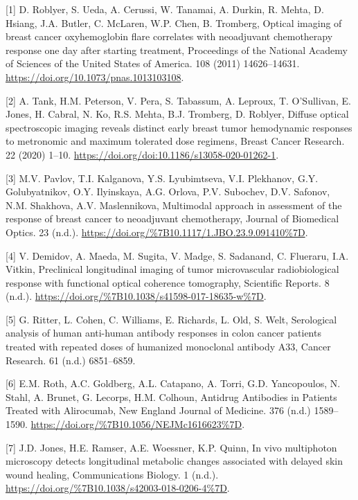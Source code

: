 \documentclass[
]{article}
\begin{document}
\hypertarget{refs}{}
\leavevmode\hypertarget{ref-roblyer2011}{}%
{[}1{]} D. Roblyer, S. Ueda, A. Cerussi, W. Tanamai, A. Durkin, R. Mehta, D. Hsiang, J.A. Butler, C. McLaren, W.P. Chen, B. Tromberg, Optical imaging of breast cancer oxyhemoglobin flare correlates with neoadjuvant chemotherapy response one day after starting treatment, Proceedings of the National Academy of Sciences of the United States of America. 108 (2011) 14626--14631. \url{https://doi.org/10.1073/pnas.1013103108}.

\leavevmode\hypertarget{ref-tank2020}{}%
{[}2{]} A. Tank, H.M. Peterson, V. Pera, S. Tabassum, A. Leproux, T. O'Sullivan, E. Jones, H. Cabral, N. Ko, R.S. Mehta, B.J. Tromberg, D. Roblyer, Diffuse optical spectroscopic imaging reveals distinct early breast tumor hemodynamic responses to metronomic and maximum tolerated dose regimens, Breast Cancer Research. 22 (2020) 1--10. \url{https://doi.org/doi:10.1186/s13058-020-01262-1}.

\leavevmode\hypertarget{ref-pavlov2018}{}%
{[}3{]} M.V. Pavlov, T.I. Kalganova, Y.S. Lyubimtseva, V.I. Plekhanov, G.Y. Golubyatnikov, O.Y. Ilyinskaya, A.G. Orlova, P.V. Subochev, D.V. Safonov, N.M. Shakhova, A.V. Maslennikova, Multimodal approach in assessment of the response of breast cancer to neoadjuvant chemotherapy, Journal of Biomedical Optics. 23 (n.d.). \url{https://doi.org/\%7B10.1117/1.JBO.23.9.091410\%7D}.

\leavevmode\hypertarget{ref-demidov2018}{}%
{[}4{]} V. Demidov, A. Maeda, M. Sugita, V. Madge, S. Sadanand, C. Flueraru, I.A. Vitkin, Preclinical longitudinal imaging of tumor microvascular radiobiological response with functional optical coherence tomography, Scientific Reports. 8 (n.d.). \url{https://doi.org/\%7B10.1038/s41598-017-18635-w\%7D}.

\leavevmode\hypertarget{ref-ritter2001}{}%
{[}5{]} G. Ritter, L. Cohen, C. Williams, E. Richards, L. Old, S. Welt, Serological analysis of human anti-human antibody responses in colon cancer patients treated with repeated doses of humanized monoclonal antibody A33, Cancer Research. 61 (n.d.) 6851--6859.

\leavevmode\hypertarget{ref-roth2017}{}%
{[}6{]} E.M. Roth, A.C. Goldberg, A.L. Catapano, A. Torri, G.D. Yancopoulos, N. Stahl, A. Brunet, G. Lecorps, H.M. Colhoun, Antidrug Antibodies in Patients Treated with Alirocumab, New England Journal of Medicine. 376 (n.d.) 1589--1590. \url{https://doi.org/\%7B10.1056/NEJMc1616623\%7D}.

\leavevmode\hypertarget{ref-jones2018}{}%
{[}7{]} J.D. Jones, H.E. Ramser, A.E. Woessner, K.P. Quinn, In vivo multiphoton microscopy detects longitudinal metabolic changes associated with delayed skin wound healing, Communications Biology. 1 (n.d.). \url{https://doi.org/\%7B10.1038/s42003-018-0206-4\%7D}.
\end{document}
